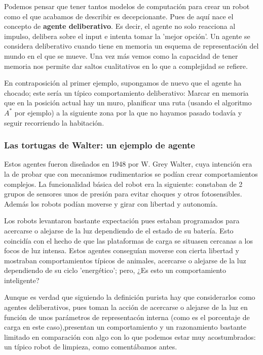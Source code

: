 \vspace{10px}

Podemos pensar que tener tantos modelos de computación para crear un robot como el que acabamos de describir es decepcionante. Pues de aquí nace el concepto de \textbf{agente deliberativo}. Es decir, el agente no solo reacciona al impulso, delibera sobre el input e intenta tomar la 'mejor opción'. Un agente se considera deliberativo cuando tiene en memoria un esquema de representación del mundo en el que se mueve. Una vez más vemos como la capacidad de tener memoria nos permite dar saltos cualitativos en lo que a complejidad se refiere.

\vspace{10px}

En contraposición al primer ejemplo, supongamos de nuevo que el agente ha chocado; este sería un típico comportamiento deliberativo: Marcar en memoria que en la posición actual hay un muro, planificar una ruta (usando el algoritmo $A^*$ por ejemplo) a la siguiente zona por la que no hayamos pasado todavía y seguir recorriendo la habitación.

\subsubsection{Las tortugas de Walter: un ejemplo de agente}

Estos agentes fueron diseñados en 1948 por W. Grey Walter, cuya intención era la de probar que con mecanismos rudimentarios se podían crear comportamientos complejos. La funcionalidad básica del robot era la siguiente: constaban de 2 grupos de sensores unos de presión para evitar choques y otros fotosensibles. Además los robots podían moverse y girar con libertad y autonomía.

\vspace{10px}

Los robots levantaron bastante expectación pues estaban programados para acercarse o alejarse de la luz dependiendo de el estado de su batería. Esto coincidía con el hecho de que las plataformas de carga se situasen cercanas a los focos de luz intensa. Estos agentes conseguían moverse con cierta libertad y mostraban comportamientos típicos de animales, acercarse o alejarse de la luz dependiendo de su ciclo 'energético'; pero, ¿Es esto un comportamiento inteligente?

\vspace{10px}

Aunque es verdad que siguiendo la definición purista hay que considerarlos como agentes deliberativos, pues toman la acción de acercarse o alejarse de la luz en función de unos parámetros de representacón interna (como es el porcentaje de carga en este caso),presentan un comportamiento y un razonamiento bastante limitado en comparación con algo con lo que podemos estar muy acostumbrados: un típico robot de limpieza, como comentábamos antes.

